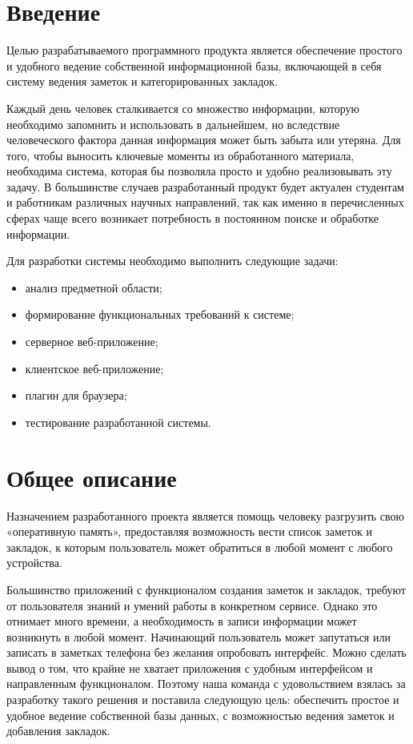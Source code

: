 \section*{Введение}
Целью разрабатываемого программного продукта является обеспечение простого и удобного ведение собственной информационной базы, включающей в себя систему ведения заметок и категорированных закладок.

Каждый день человек сталкивается со множество информации, которую необходимо запомнить и использовать в дальнейшем, но вследствие человеческого фактора данная информация может быть забыта или утеряна. Для того, чтобы выносить ключевые моменты из обработанного материала, необходима система, которая бы позволяла просто и удобно реализовывать эту задачу. В большинстве случаев разработанный продукт будет актуален студентам и работникам различных научных направлений, так как именно в перечисленных сферах чаще всего возникает потребность в постоянном поиске и обработке информации.

Для разработки системы необходимо выполнить следующие задачи:
\begin{itemize}
	\item анализ предметной области;
	\item формирование функциональных требований к системе;
	\item серверное веб-приложение;
        \item клиентское веб-приложение;
        \item плагин для браузера;
        \item тестирование разработанной системы.
\end{itemize}


\newpage
\section{Общее описание}
Назначением разработанного проекта является помощь человеку разгрузить свою «оперативную память», предоставляя возможность вести список заметок и закладок, к которым пользователь может обратиться в любой момент с любого устройства.

Большинство приложений с функционалом создания заметок и закладок, требуют от пользователя знаний и умений работы в конкретном сервисе. Однако это отнимает много времени, а необходимость в записи информации может возникнуть в любой момент. Начинающий пользователь может запутаться или записать в заметках телефона без желания опробовать интерфейс. Можно сделать вывод о том, что крайне не хватает приложения с удобным интерфейсом и направленным функционалом. Поэтому наша команда с удовольствием взялась за разработку такого решения и поставила следующую цель: обеспечить простое и удобное ведение собственной базы данных, с возможностью ведения заметок и добавления закладок.

